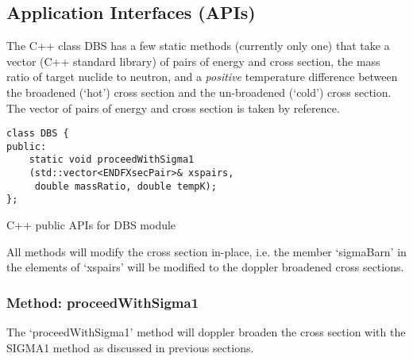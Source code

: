 \subsection{Application Interfaces (APIs)}
The C++ class DBS has a few static methods (currently only one) that take a vector (C++ standard library) of pairs of energy and cross section, the mass ratio of target nuclide to neutron, and a {\em positive} temperature difference between the broadened (`hot') cross section and the un-broadened (`cold') cross section. The vector of pairs of energy and cross section is taken by reference.
\begin{program}[!htb]
\centering
\begin{verbatim} 
class DBS {
public:
    static void proceedWithSigma1
    (std::vector<ENDFXsecPair>& xspairs, 
     double massRatio, double tempK);
};
\end{verbatim}
\caption{ \label{program:ndls_cpp_api}
C++ public APIs for DBS module}
\end{program}
All methods will modify the cross section in-place, i.e. the member `sigmaBarn' in the elements of `xspairs' will be modified to the doppler broadened cross sections.

\subsubsection{Method: proceedWithSigma1}
The `proceedWithSigma1' method will doppler broaden the cross section with the SIGMA1 method as discussed in previous sections.
